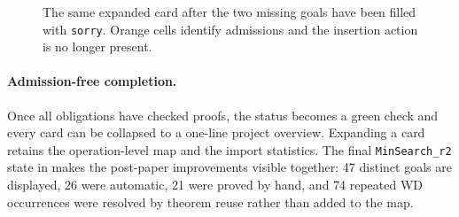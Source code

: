 \begin{figure}[ht!]
{%
  }
  \caption{The same expanded card after the two missing goals have been
    filled with \texttt{sorry}.  Orange cells identify admissions and the
    insertion action is no longer present.}
  \label{fig:barrel-state-sorry}
\end{figure}
\FloatBarrier

\paragraph*{Admission-free completion.}
Once all obligations have checked proofs, the status becomes a green check and
every card can be collapsed to a one-line project overview.  Expanding a card
retains the operation-level map and the import statistics.  The final
\texttt{MinSearch\_r2} state in  makes the
post-paper improvements visible together: 47 distinct goals are displayed,
26 were automatic, 21 were proved by hand, and 74 repeated WD occurrences were
resolved by theorem reuse rather than added to the map.

